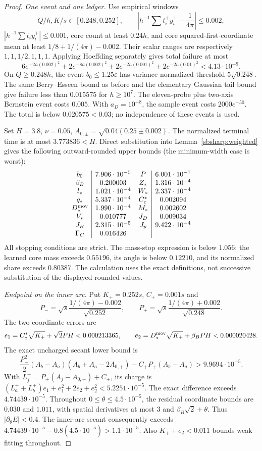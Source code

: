 \documentclass[11pt]{article}
\theoremstyle{remark}
\begin{document}
\begin{proof}
\emph{One event and one ledger.}
Use empirical windows
\[
 Q/h,K/s\in[0.248,0.252],\qquad
 \left|h^{-1}\sum t_i^+y_i^+-\frac1{4\pi}\right|\le0.002,
\]
$|h^{-1}\sum t_i y_i^+|\le0.001$, core count at least $0.24h$,
and core squared-first-coordinate mean at least
$1/8+1/(4\pi)-0.002$. Their scalar ranges are respectively
$1,1,1/2,1,1,1$. Applying Hoeffding separately gives total failure at most
\[
 6e^{-2h(0.002)^2}+2e^{-8h(0.002)^2}
             +2e^{-2h(0.001)^2}+2e^{-2h(0.01)^2}<4.13\cdot10^{-9}.
\]
On $Q\ge0.248h$, the event $b_0\le1.25\varepsilon$ has
variance-normalized threshold $5\sqrt{0.248}$. The same
Berry--Esseen bound as before and the elementary Gaussian tail bound
give failure less than $0.015575$ for $h\ge10^7$.
The eleven-probe plus two-axis Bernstein event costs $0.005$.
With $a_D=10^{-8}$, the sample event costs $2000e^{-50}$.
The total is below $0.020575<0.03$; no independence of these events is
used.

Set $H=3.8$, $\nu=0.05$, $A_{0,\pm}=\sqrt{0.04(0.25\pm0.002)}$.
The normalized terminal time is at most $3.773836<H$. Direct
substitution into Lemma~\ref{sbsharp:weighted} gives the following
outward-rounded upper bounds (the minimum-width case is worst):
\[
\begin{array}{c|c@{\quad}c|c}
 b_0&7.906\cdot10^{-5}&P&6.001\cdot10^{-7}\\
 \beta_B&0.200003&Z_*&1.316\cdot10^{-4}\\
 l_*&1.021\cdot10^{-4}&W_*&2.337\cdot10^{-4}\\
 q_*&5.337\cdot10^{-4}&C_c^*&0.002094\\
 D_*^{\rm mov}&1.990\cdot10^{-4}&M_*&0.002602\\
 V_*&0.010777&J_D&0.009034\\
 J_B&2.315\cdot10^{-5}&J_p&9.422\cdot10^{-4}\\
 \Gamma_C&0.016426&&
\end{array}
\]
All stopping conditions are strict. The mass-stop expression is below
$1.056$; the learned core mass exceeds $0.55196$, its angle is below
$0.12210$, and its normalized share exceeds $0.80387$.
The calculation uses the exact definitions, not successive substitution
of the displayed rounded values.

\emph{Endpoint on the inner arc.}
Put $K_+=0.252s$, $C_+=0.001s$ and
\[
 P_-=\sqrt{s}\frac{1/(4\pi)-0.002}{\sqrt{0.252}},\qquad
 P_+=\sqrt{s}\frac{1/(4\pi)+0.002}{\sqrt{0.248}}.
\]
The two coordinate errors are
\[
 e_1=C_c^*\sqrt{K_+}+\sqrt2PH<0.000213365,\qquad
 e_2=D_*^{\rm mov}\sqrt{K_+}+\beta_BPH<0.000020428.
\]
The exact uncharged secant lower bound is
\[
 \frac{P_-^2}{2}(A_b-A_a)(A_b+A_a-2A_{0,+})
       -C_+P_+(A_b-A_a)>9.9694\cdot10^{-5}.
\]
With $L_j^+=P_+(A_j-A_{0,-})+C_+$, its charge is
$(L_a^++L_b^+)e_1+e_1^2+2e_2+e_2^2<5.2251\cdot10^{-5}$.
The exact difference exceeds $4.74439\cdot10^{-5}$.
Throughout $0\le\theta\le4.5\cdot10^{-5}$, the residual coordinate
bounds are $0.030$ and $1.011$, with spatial derivatives at most
$3$ and $\beta_B\sqrt2+\theta$. Thus $|\partial_\theta E|<0.4$.
The inner-arc secant consequently exceeds
$4.74439\cdot10^{-5}-0.8(4.5\cdot10^{-5})>1.1\cdot10^{-5}$.
Also $K_++e_2<0.011$ bounds weak fitting throughout.


\end{proof}
\end{document}
